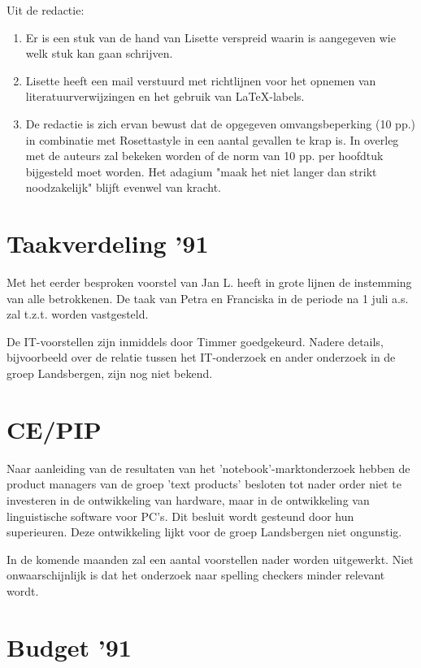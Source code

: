 \noindent
Uit de redactie: 
\begin{enumerate}
  \item Er is een stuk van de hand van Lisette verspreid waarin is aangegeven
wie welk stuk kan gaan schrijven.
  \item Lisette heeft een mail verstuurd met richtlijnen voor het opnemen van 
literatuurverwijzingen en het gebruik van {\LaTeX}-labels.
\item De redactie is zich ervan bewust dat de 
opgegeven omvangsbeperking (10 pp.) in combinatie met Rosettastyle 
in een aantal gevallen te krap is. In overleg met de auteurs 
zal bekeken worden 
of de norm van 10 pp. per hoofdtuk bijgesteld moet worden. 
Het adagium "maak het niet langer dan strikt noodzakelijk" blijft evenwel van 
kracht. 

\end{enumerate}

\section{Taakverdeling '91}
Met het eerder besproken voorstel van Jan L. heeft in grote lijnen de 
instemming van alle betrokkenen.
De taak van Petra en Franciska in de periode na 1 juli a.s. 
zal t.z.t. worden vastgesteld.

De IT-voorstellen zijn inmiddels door Timmer goedgekeurd. Nadere details, 
bijvoorbeeld over de relatie tussen het IT-onderzoek en ander onderzoek in de
groep Landsbergen, zijn nog niet bekend.

\section{\bf CE/PIP}
Naar aanleiding van de resultaten van het 'notebook'-marktonderzoek 
hebben de product managers van de groep 'text products' besloten tot nader 
order
niet te investeren in de ontwikkeling van hardware, maar in de ontwikkeling van 
linguistische software voor PC's. Dit besluit wordt gesteund door hun 
superieuren.
Deze ontwikkeling lijkt voor de groep Landsbergen niet ongunstig.

In de komende maanden zal een aantal 
voorstellen nader worden uitgewerkt. Niet onwaarschijnlijk is dat het onderzoek 
naar spelling checkers minder relevant wordt. 

\section{\bf Budget '91}

